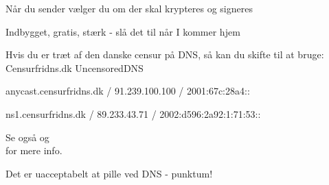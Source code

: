 \documentclass[20pt,landscape,a4paper,footrule]{foils}
\begin{document}


Når du sender vælger du om der skal krypteres og signeres



\centerline{Indbygget, gratis, stærk - slå det til når I kommer hjem}



Hvis du er træt af den danske censur på DNS, så kan du skifte til at bruge:\\
Censurfridns.dk UncensoredDNS

\begin{list2}
\item anycast.censurfridns.dk / 91.239.100.100 / 2001:67c:28a4::
\item ns1.censurfridns.dk / 89.233.43.71 / 2002:d596:2a92:1:71:53::
\end{list2}
Se også  og\\
  for mere info.

\vskip 2cm

\centerline{\Large Det er uacceptabelt at pille ved DNS - punktum!}


\myquestionspage
\end{document}
